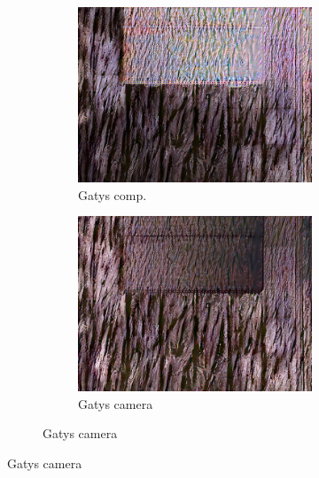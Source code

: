 \begin{figure}[]
\begin{subfigure}{\textwidth}
\begin{subfigure}{0.24\textwidth}
            \centering
            \includegraphics[width=\textwidth]{images/04-experiment02/carpet/wood/gatys_im.jpg}
            \caption*{Gatys comp.}
        \end{subfigure}
        \hfill
        \begin{subfigure}{0.24\textwidth}
            \centering
            \includegraphics[width=\textwidth]{images/04-experiment02/carpet/wood/gatys_proj.jpg}
            \caption*{Gatys camera}
        \end{subfigure}
        

\end{subfigure}
\end{figure}
